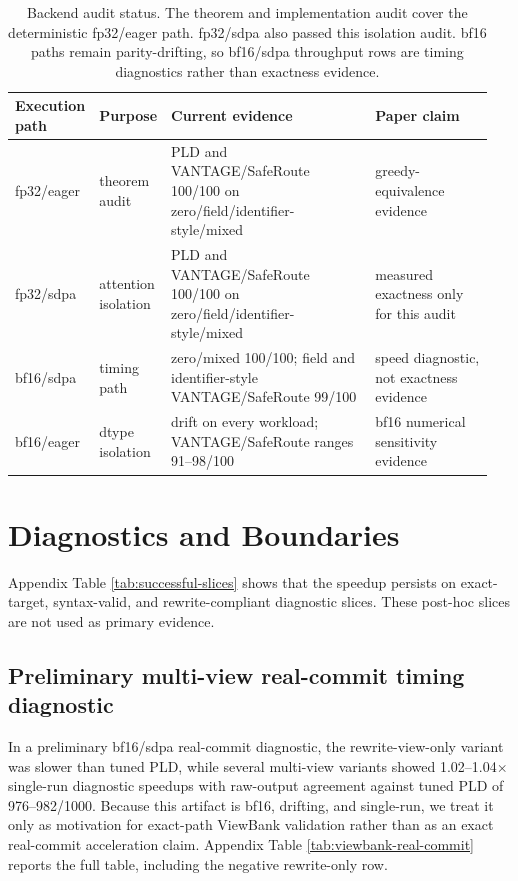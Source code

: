\documentclass[11pt,a4paper]{article}
\begin{document}
\begin{table}[h]
\centering\scriptsize
\caption{Backend audit status. The theorem and implementation audit cover the
deterministic fp32/eager path. fp32/sdpa also passed this isolation audit. bf16
paths remain parity-drifting, so bf16/sdpa throughput rows are timing
diagnostics rather than exactness evidence.}
\label{tab:backend-audit}
\setlength{\tabcolsep}{3pt}
\begin{tabular}{@{}L{0.13\linewidth}L{0.14\linewidth}L{0.43\linewidth}L{0.25\linewidth}@{}}
\toprule
Execution path & Purpose & Current evidence & Paper claim \\
\midrule
fp32/eager & theorem audit & PLD and VANTAGE/SafeRoute 100/100 on zero/field/identifier-style/mixed & greedy-equivalence evidence \\
fp32/sdpa & attention isolation & PLD and VANTAGE/SafeRoute 100/100 on zero/field/identifier-style/mixed & measured exactness only for this audit \\
bf16/sdpa & timing path & zero/mixed 100/100; field and identifier-style VANTAGE/SafeRoute 99/100 & speed diagnostic, not exactness evidence \\
bf16/eager & dtype isolation & drift on every workload; VANTAGE/SafeRoute ranges 91--98/100 & bf16 numerical sensitivity evidence \\
\bottomrule
\end{tabular}
\end{table}


\section{Diagnostics and Boundaries}
\label{sec:diagnostics}

Appendix Table \ref{tab:successful-slices} shows that the speedup persists
on exact-target, syntax-valid, and rewrite-compliant diagnostic slices.
These post-hoc slices are not used as primary evidence.

\subsection{Preliminary multi-view real-commit timing diagnostic}
\label{sec:mv-real-commit}

In a preliminary bf16/sdpa real-commit diagnostic, the rewrite-view-only variant was
slower than tuned PLD, while several multi-view variants showed
1.02--1.04$\times$ single-run diagnostic speedups with raw-output agreement
against tuned PLD of 976--982/1000. Because this artifact is bf16, drifting,
and single-run, we
treat it only as motivation for exact-path ViewBank validation rather than as
an exact real-commit acceleration claim. Appendix Table
\ref{tab:viewbank-real-commit} reports the full table, including the negative
rewrite-only row.
\end{document}
